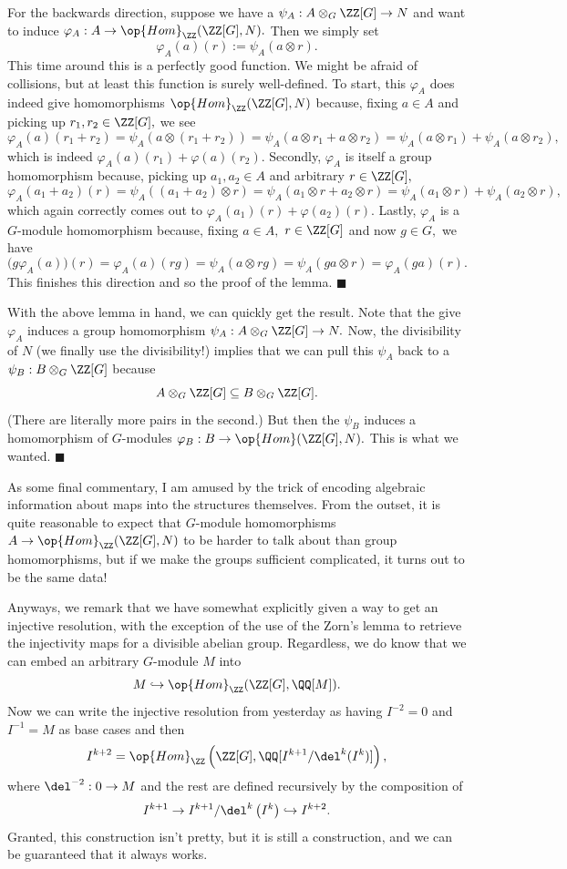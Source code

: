 For the backwards direction, suppose we have a $\psi_A:A\otimes_G\ZZ[G]\to N$ and want to induce $\varphi_A:A\to\op{Hom}_\ZZ(\ZZ[G],N).$ Then we simply set
\[\varphi_A(a)(r):=\psi_A(a\otimes r).\]
This time around this is a perfectly good function. We might be afraid of collisions, but at least this function is surely well-defined. To start, this $\varphi_A$ does indeed give homomorphisms $\op{Hom}_\ZZ(\ZZ[G],N)$ because, fixing $a\in A$ and picking up $r_1,r_2\in\ZZ[G],$ we see
\[\varphi_A(a)(r_1+r_2)=\psi_A(a\otimes(r_1+r_2))=\psi_A(a\otimes r_1+a\otimes r_2)=\psi_A(a\otimes r_1)+\psi_A(a\otimes r_2),\]
which is indeed $\varphi_A(a)(r_1)+\varphi(a)(r_2).$ Secondly, $\varphi_A$ is itself a group homomorphism because, picking up $a_1,a_2\in A$ and arbitrary $r\in\ZZ[G],$
\[\varphi_A(a_1+a_2)(r)=\psi_A((a_1+a_2)\otimes r)=\psi_A(a_1\otimes r+a_2\otimes r)=\psi_A(a_1\otimes r)+\psi_A(a_2\otimes r),\]
which again correctly comes out to $\varphi_A(a_1)(r)+\varphi(a_2)(r).$ Lastly, $\varphi_A$ is a $G$-module homomorphism because, fixing $a\in A,$ $r\in\ZZ[G]$ and now $g\in G,$ we have
\[\big(g\varphi_A(a)\big)(r)=\varphi_A(a)(rg)=\psi_A(a\otimes rg)=\psi_A(ga\otimes r)=\varphi_A(ga)(r).\]
This finishes this direction and so the proof of the lemma. $\blacksquare$

With the above lemma in hand, we can quickly get the result. Note that the give $\varphi_A$ induces a group homomorphism $\psi_A:A\otimes_G\ZZ[G]\to N.$ Now, the divisibility of $N$ (we finally use the divisibility!) implies that we can pull this $\psi_A$ back to a $\psi_B:B\otimes_G\ZZ[G]$ because
\[A\otimes_G\ZZ[G]\subseteq B\otimes_G\ZZ[G].\]
(There are literally more pairs in the second.) But then the $\psi_B$ induces a homomorphism of $G$-modules $\varphi_B:B\to\op{Hom}(\ZZ[G],N).$ This is what we wanted. $\blacksquare$

As some final commentary, I am amused by the trick of encoding algebraic information about maps into the structures themselves. From the outset, it is quite reasonable to expect that $G$-module homomorphisms $A\to\op{Hom}_\ZZ(\ZZ[G],N)$ to be harder to talk about than group homomorphisms, but if we make the groups sufficient complicated, it turns out to be the same data!

Anyways, we remark that we have somewhat explicitly given a way to get an injective resolution, with the exception of the use of the Zorn's lemma to retrieve the injectivity maps for a divisible abelian group. Regardless, we do know that we can embed an arbitrary $G$-module $M$ into
\[M\hookrightarrow\op{Hom}_\ZZ(\ZZ[G],\QQ[M]).\]
Now we can write the injective resolution from yesterday as having $I^{-2}=0$ and $I^{-1}=M$ as base cases and then
\[I^{k+2}=\op{Hom}_\ZZ\left(\ZZ[G],\QQ[I^{k+1}/\del^k(I^k)]\right),\]
where $\del^{-2}:0\to M$ and the rest are defined recursively by the composition of
\[I^{k+1}\to I^{k+1}/\del^k\left(I^k\right)\hookrightarrow I^{k+2}.\]
Granted, this construction isn't pretty, but it is still a construction, and we can be guaranteed that it always works.

